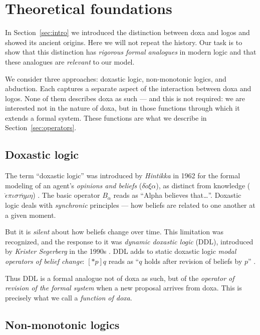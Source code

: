 \documentclass[12pt,a4paper]{article}
\begin{document}
\section{Theoretical foundations}
\label{sec:theory}

In Section~\ref{sec:intro} we introduced the distinction between doxa and
logos and showed its ancient origins. Here we will not repeat the history. Our
task is to show that this distinction has \emph{rigorous formal analogues} in
modern logic and that these analogues are \emph{relevant} to our model.

We consider three approaches: doxastic logic, non-monotonic logics, and
abduction. Each captures a separate aspect of the interaction between doxa and
logos. None of them describes doxa as such --- and this is not required: we are
interested not in the nature of doxa, but in those functions through which it
extends a formal system. These functions are what we describe in
Section~\ref{sec:operators}.

\subsection{Doxastic logic}
\label{sec:doxastic}

The term ``doxastic logic'' was introduced by \emph{Hintikka} in 1962 for the
formal modeling of an agent's \emph{opinions and beliefs}
($\delta\acute{o}\xi\alpha$), as distinct from knowledge
($\grave{\epsilon}\pi\iota\sigma\tau\acute{\eta}\mu\eta$) \cite{hintikka}. The
basic operator $B_\alpha$ reads as ``Alpha believes that\dots''. Doxastic logic
deals with \emph{synchronic} principles --- how beliefs are related to one
another at a given moment.

But it is \emph{silent} about how beliefs change over time. This limitation
was recognized, and the response to it was \emph{dynamic doxastic logic} (DDL),
introduced by \emph{Krister Segerberg} in the 1990s \cite{segerberg01}. DDL
adds to static doxastic logic \emph{modal operators of belief change}: $[*p]q$
reads as ``$q$ holds after revision of beliefs by $p$'' \cite{segerberg10}.

Thus DDL is a formal analogue not of doxa as such, but of the \emph{operator of
revision of the formal system} when a new proposal arrives from doxa. This is
precisely what we call a \emph{function of doxa}.

\subsection{Non-monotonic logics}
\label{sec:nonmonotonic}
\end{document}
